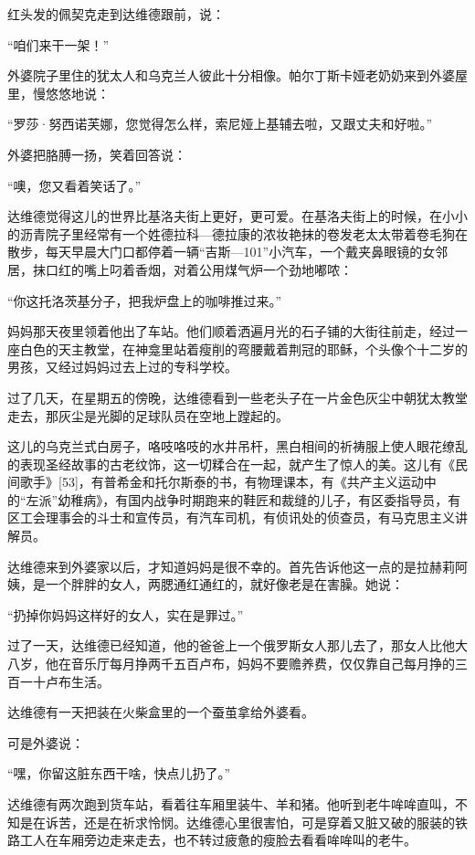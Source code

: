 红头发的佩契克走到达维德跟前，说：

“咱们来干一架！”

外婆院子里住的犹太人和乌克兰人彼此十分相像。帕尔丁斯卡娅老奶奶来到外婆屋里，慢悠悠地说：

“罗莎·努西诺芙娜，您觉得怎么样，索尼娅上基辅去啦，又跟丈夫和好啦。”

外婆把胳膊一扬，笑着回答说：

“噢，您又看着笑话了。”

达维德觉得这儿的世界比基洛夫街上更好，更可爱。在基洛夫街上的时候，在小小的沥青院子里经常有一个姓德拉科—德拉康的浓妆艳抹的卷发老太太带着卷毛狗在散步，每天早晨大门口都停着一辆“吉斯—101”小汽车，一个戴夹鼻眼镜的女邻居，抹口红的嘴上叼着香烟，对着公用煤气炉一个劲地嘟哝：

“你这托洛茨基分子，把我炉盘上的咖啡推过来。”

妈妈那天夜里领着他出了车站。他们顺着洒遍月光的石子铺的大街往前走，经过一座白色的天主教堂，在神龛里站着瘦削的弯腰戴着荆冠的耶稣，个头像个十二岁的男孩，又经过妈妈过去上过的专科学校。

过了几天，在星期五的傍晚，达维德看到一些老头子在一片金色灰尘中朝犹太教堂走去，那灰尘是光脚的足球队员在空地上蹚起的。

这儿的乌克兰式白房子，咯吱咯吱的水井吊杆，黑白相间的祈祷服上使人眼花缭乱的表现圣经故事的古老纹饰，这一切糅合在一起，就产生了惊人的美。这儿有《民间歌手》[53]，有普希金和托尔斯泰的书，有物理课本，有《共产主义运动中的“左派”幼稚病》，有国内战争时期跑来的鞋匠和裁缝的儿子，有区委指导员，有区工会理事会的斗士和宣传员，有汽车司机，有侦讯处的侦查员，有马克思主义讲解员。

达维德来到外婆家以后，才知道妈妈是很不幸的。首先告诉他这一点的是拉赫莉阿姨，是一个胖胖的女人，两腮通红通红的，就好像老是在害臊。她说：

“扔掉你妈妈这样好的女人，实在是罪过。”

过了一天，达维德已经知道，他的爸爸上一个俄罗斯女人那儿去了，那女人比他大八岁，他在音乐厅每月挣两千五百卢布，妈妈不要赡养费，仅仅靠自己每月挣的三百一十卢布生活。

达维德有一天把装在火柴盒里的一个蚕茧拿给外婆看。

可是外婆说：

“嘿，你留这脏东西干啥，快点儿扔了。”

迖维德有两次跑到货车站，看着往车厢里装牛、羊和猪。他听到老牛哞哞直叫，不知是在诉苦，还是在祈求怜悯。达维德心里很害怕，可是穿着又脏又破的服装的铁路工人在车厢旁边走来走去，也不转过疲惫的瘦脸去看看哞哞叫的老牛。

